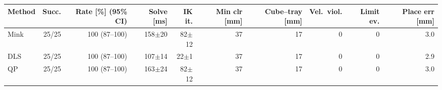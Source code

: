 \begin{tabular}{lrrrrrrrrr}
\toprule
Method & Succ. & Rate [\%] (95\% CI) & Solve [ms] & IK it. & Min clr [mm] & Cube--tray [mm] & Vel.\ viol. & Limit ev. & Place err [mm]\\
\midrule
Mink & 25/25 & 100 (87--100) & 158$\pm$20 & 82$\pm$12 & 37 & 17 & 0 & 0 & 3.0\\
DLS & 25/25 & 100 (87--100) & 107$\pm$14 & 22$\pm$1 & 37 & 17 & 0 & 0 & 2.9\\
QP & 25/25 & 100 (87--100) & 163$\pm$24 & 82$\pm$12 & 37 & 17 & 0 & 0 & 3.0\\
\bottomrule
\end{tabular}
